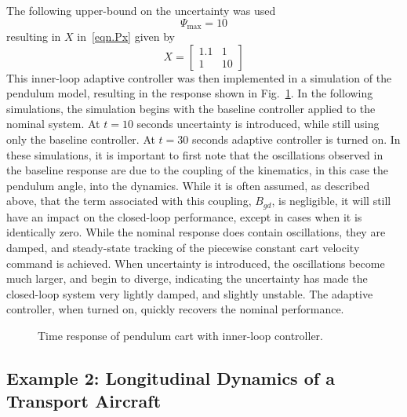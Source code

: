 The following upper-bound on the uncertainty was used
\begin{equation*}
  \Psi_{\text{max}} = 10
\end{equation*}
resulting in $X$ in\ \eqref{eqn.Px} given by
\begin{equation*}
  X =
  \begin{bmatrix}
    1.1 & 1 \\
    1 & 10
  \end{bmatrix}
\end{equation*}
This inner-loop adaptive controller was then implemented in a simulation of the pendulum model, resulting in the response shown in Fig.~\ref{fig.innerLoopPendulumCart}.
In the following simulations, the simulation begins with the baseline controller applied to the nominal system.
At $t=10$ seconds uncertainty is introduced, while still using only the baseline controller.
At $t=30$ seconds adaptive controller is turned on.
In these simulations, it is important to first note that the oscillations observed in the baseline response are due to the coupling of the kinematics, in this case the pendulum angle, into the dynamics.
While it is often assumed, as described above, that the term associated with this coupling, $B_{gd}$, is negligible, it will still have an impact on the closed-loop performance, except in cases when it is identically zero.
While the nominal response does contain oscillations, they are damped, and steady-state tracking of the piecewise constant cart velocity command is achieved.
When uncertainty is introduced, the oscillations become much larger, and begin to diverge, indicating the uncertainty has made the closed-loop system very lightly damped, and slightly unstable.
The adaptive controller, when turned on, quickly recovers the nominal performance.

\newpage
\begin{figure}[H]
  \hspace{-0.25in}
  \noindent{}
  \vspace{-0.95in}
  \caption{Time response of pendulum cart with inner-loop controller.\label{fig.innerLoopPendulumCart}}
\end{figure}

\subsection{Example 2: Longitudinal Dynamics of a Transport Aircraft}

